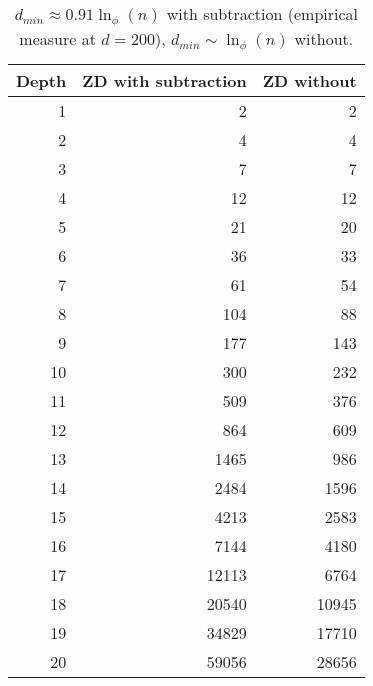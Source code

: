 \begin{table}
  \begin{tabular}{| r || r | r |}
    \hline
    Depth & ZD with subtraction & ZD without\\
    \hline
     1 &      2 &      2\\
     2 &      4 &      4\\
     3 &      7 &      7\\
     4 &     12 &     12\\
     5 &     21 &     20\\
     6 &     36 &     33\\
     7 &     61 &     54\\
     8 &    104 &     88\\
     9 &    177 &    143\\
    10 &    300 &    232\\
    11 &    509 &    376\\
    12 &    864 &    609\\
    13 &   1465 &    986\\
    14 &   2484 &   1596\\
    15 &   4213 &   2583\\
    16 &   7144 &   4180\\
    17 &  12113 &   6764\\
    18 &  20540 &  10945\\
    19 &  34829 &  17710\\
    20 &  59056 &  28656\\
    \hline
  \end{tabular}
  \caption{$d_\mathit{min}\approx 0.91\ln_\phi(n)$ with subtraction
  (empirical measure at $d=200$),
    $d_\mathit{min}\sim\ln_\phi(n)$ without.}
\end{table}
